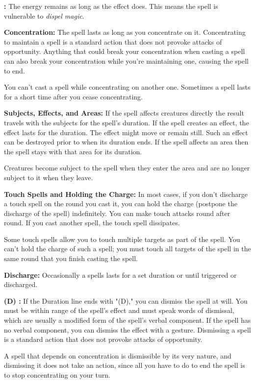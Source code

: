 \textbf{:} The energy remains as long as the effect does. This means the 
spell is vulnerable to \textit{dispel magic}. 

\textbf{Concentration:} The spell lasts as long as you concentrate on it. Concentrating 
to maintain a spell is a standard action that does not provoke attacks of opportunity. 
Anything that could break your concentration when casting a spell can also break 
your concentration while you're maintaining one, causing the spell to end.

You can't cast a spell while concentrating on another one. Sometimes a spell lasts 
for a short time after you cease concentrating.

\textbf{Subjects, Effects, and Areas:} If the spell affects creatures directly 
the result travels with the subjects for the spell's duration. If the spell creates 
an effect, the effect lasts for the duration. The effect might move or remain still. 
Such an effect can be destroyed prior to when its duration ends. If the spell affects 
an area then the spell stays with that area for its duration. 

Creatures become subject to the spell when they enter the area and are no longer 
subject to it when they leave.

\textbf{Touch Spells and Holding the Charge:} In most cases, if you don't discharge 
a touch spell on the round you cast it, you can hold the charge (postpone the discharge 
of the spell) indefinitely. You can make touch attacks round after round. If you 
cast another spell, the touch spell dissipates.

Some touch spells allow you to touch multiple targets as part of the spell. 
You can't hold the charge of such a spell; you must touch all targets of the spell 
in the same round that you finish casting the spell.

\textbf{Discharge:} Occasionally a spells lasts for a set duration or until triggered 
or discharged.

\textbf{(D) :} If the Duration line ends with "(D)," you can dismiss 
the spell at will. You must be within range of the spell's effect and must speak 
words of dismissal, which are usually a modified form of the spell's verbal component. 
If the spell has no verbal component, you can dismiss the effect with a gesture. 
Dismissing a spell is a standard action that does not provoke attacks of opportunity.

A spell that depends on concentration is dismissible by its very nature, and dismissing 
it does not take an action, since all you have to do to end the spell is to stop 
concentrating on your turn.

